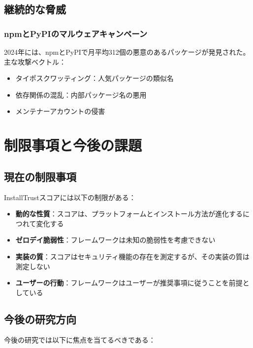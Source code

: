 \documentclass[Specialissue]{jsaiart}
\begin{document}
\subsection{継続的な脅威}

\subsubsection{npmとPyPIのマルウェアキャンペーン}

2024年には、npmとPyPIで月平均312個の悪意のあるパッケージが発見された\cite{pypi2023malware,zimmermann2019npm}。主な攻撃ベクトル：

\begin{itemize}
    \item タイポスクワッティング：人気パッケージの類似名
    \item 依存関係の混乱：内部パッケージ名の悪用
    \item メンテナーアカウントの侵害
\end{itemize}

\section{制限事項と今後の課題}

\subsection{現在の制限事項}

InstallTrustスコアには以下の制限がある：

\begin{itemize}
    \item \textbf{動的な性質}：スコアは、プラットフォームとインストール方法が進化するにつれて変化する
    \item \textbf{ゼロデイ脆弱性}：フレームワークは未知の脆弱性を考慮できない
    \item \textbf{実装の質}：スコアはセキュリティ機能の存在を測定するが、その実装の質は測定しない
    \item \textbf{ユーザーの行動}：フレームワークはユーザーが推奨事項に従うことを前提としている
\end{itemize}

\subsection{今後の研究方向}

今後の研究では以下に焦点を当てるべきである：
\end{document}
